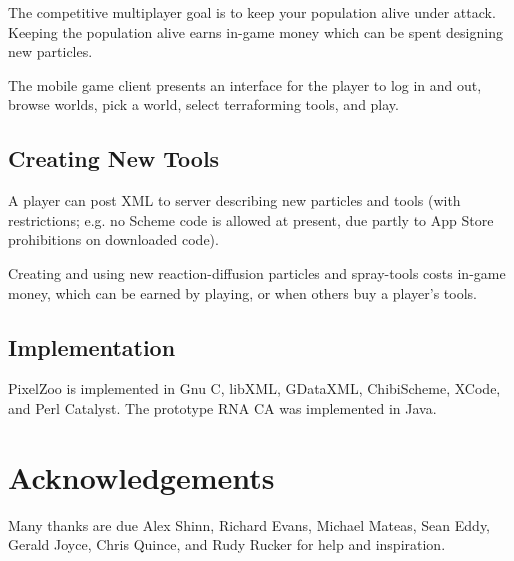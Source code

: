 \documentclass{acm_proc_article-sp}
\begin{document}
The competitive multiplayer goal is to keep your population alive under attack.
Keeping the population alive earns in-game money which can be spent designing new particles.

The mobile game client presents an interface for the player to
log in and out, browse worlds, pick a world, select terraforming tools, and play.

\subsection{Creating New Tools}

A player can post XML to server describing new particles and tools
(with restrictions; e.g. no Scheme code is allowed at present,
due partly to App Store prohibitions on downloaded code).

Creating and using new reaction-diffusion particles and spray-tools costs in-game money,
which can be earned by playing, or when others buy a player's tools.

\subsection{Implementation}

PixelZoo is implemented in Gnu C, libXML, GDataXML, ChibiScheme, XCode, and Perl Catalyst.
The prototype RNA CA was implemented in Java.

\section{Acknowledgements}

Many thanks are due Alex Shinn, Richard Evans, Michael Mateas, Sean Eddy, Gerald Joyce, Chris Quince,
and Rudy Rucker for help and inspiration.




\balancecolumns
\end{document}
